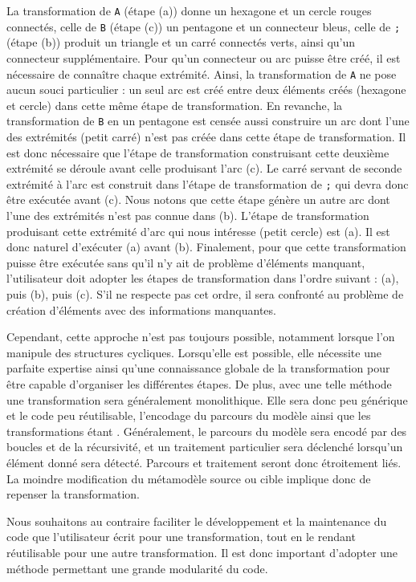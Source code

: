 La transformation de \texttt{A} (étape (a)) donne un hexagone et un cercle
rouges connectés, celle de \texttt{B} (étape (c)) un pentagone et un
connecteur bleus, celle de \texttt{;} (étape (b)) produit un triangle
et un carré connectés verts, ainsi qu'un connecteur supplémentaire. Pour qu'un
connecteur ou arc puisse être créé, il est nécessaire de connaître chaque
extrémité. Ainsi, la transformation de \texttt{A} ne pose aucun souci
particulier : un seul arc est créé entre deux éléments créés (hexagone et
cercle) dans cette même étape de transformation. En revanche, la
transformation de \texttt{B} en un pentagone est censée aussi construire un arc
dont l'une des extrémités (petit carré) n'est pas créée dans cette étape de
transformation. Il est donc nécessaire que l'étape de transformation
construisant cette deuxième extrémité se déroule avant celle produisant l'arc
(c). Le carré servant de seconde extrémité à l'arc est construit dans l'étape
de transformation de \texttt{;} qui devra donc être exécutée avant (c). Nous
notons que cette étape génère un autre arc dont l'une des extrémités n'est pas
connue dans (b). L'étape de transformation produisant cette extrémité d'arc
qui nous intéresse (petit cercle) est (a). Il est donc naturel d'exécuter (a)
avant (b). Finalement, pour que cette transformation puisse être exécutée sans
qu'il n'y ait de problème d'éléments manquant, l'utilisateur doit adopter les
étapes de transformation dans l'ordre suivant : (a), puis (b), puis (c). S'il
ne respecte pas cet ordre, il sera confronté au problème de création d'éléments
avec des informations manquantes.

Cependant, cette approche n'est pas toujours possible, notamment lorsque l'on
manipule des structures cycliques. Lorsqu'elle est possible, elle nécessite une
parfaite expertise ainsi qu'une connaissance globale de la transformation pour
être capable d'organiser les différentes étapes. De plus, avec une telle
méthode une transformation sera généralement monolithique. Elle sera donc peu
générique et le code peu réutilisable, l'encodage du parcours du modèle ainsi
que les transformations étant {\adhoc}. Généralement, le parcours du modèle
sera encodé par des boucles et de la récursivité, et un traitement particulier
sera déclenché lorsqu'un élément donné sera détecté. Parcours et traitement
seront donc étroitement liés. La moindre modification du métamodèle source ou
cible implique donc de repenser la transformation.

Nous souhaitons au contraire faciliter le développement et la maintenance du
code que l'utilisateur écrit pour une transformation, tout en le rendant
réutilisable pour une autre transformation. Il est donc important d'adopter
une méthode permettant une grande modularité du code.


